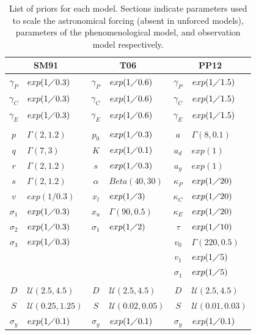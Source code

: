 \documentclass[a4paper,12pt]{article}
\begin{document}
\begin{table}[t]
\begin{center}
\begin{tabular}{| c l | c l | c l |}
\hline
\multicolumn{2}{|c|}{SM91} & \multicolumn{2}{|c|}{T06} & \multicolumn{2}{|c|}{PP12} \\
\hline
$\gamma_P$ & $exp(1 \diagup 0.3)$ & $\gamma_P$ & $exp(1 \diagup 0.6)$ & $\gamma_P$ & $exp(1 \diagup 1.5)$ \\
$\gamma_C$ & $exp(1 \diagup 0.3)$ & $\gamma_C$ & $exp(1 \diagup 0.6)$ & $\gamma_C$ & $exp(1 \diagup 1.5)$ \\
$\gamma_E$ & $exp(1 \diagup 0.3)$ & $\gamma_E$ & $exp(1 \diagup 0.6)$ & $\gamma_E$ & $exp(1 \diagup 1.5)$ \\
& & & & & \\
$p$ & $\Gamma(2,1.2)$ & $p_0$ & $exp(1 \diagup 0.3)$ & $a$ & $\Gamma(8,0.1)$\\
$q$ & $\Gamma(7,3)$ & $K$ & $exp(1 \diagup 0.1)$ & $a_d$ & $exp(1)$\\
$r$ & $\Gamma(2,1.2)$ & $s$ & $exp(1 \diagup 0.3)$ & $a_g$ & $exp(1)$\\
$s$ & $\Gamma(2,1.2)$ & $\alpha$ & $Beta(40,30)$ & $\kappa_P$ & $exp(1 \diagup 20)$ \\ 
$v$ & $exp(1/0.3)$ & $x_l$ & $exp(1 \diagup 3)$ & $\kappa_C$ & $exp(1 \diagup 20)$ \\
$\sigma_1$ & $exp(1 \diagup 0.3)$ & $x_u$ & $\Gamma(90,0.5)$ & $\kappa_E$ & $exp(1 \diagup 20)$ \\
$\sigma_2$ & $exp(1 \diagup 0.3)$ & $\sigma_1$ & $exp(1 \diagup 2)$ & $\tau$ & $exp(1 \diagup 10)$ \\
$\sigma_3$ & $exp(1 \diagup 0.3)$ & & & $v_0$ & $\Gamma(220,0.5)$ \\
& & & & $v_1$ & $exp(1 \diagup 5)$\\
& & & & $\sigma_1$ & $exp(1 \diagup 5)$ \\
& & & & & \\
$D$ & $\mathcal{U}(2.5,4.5)$ & $D$ & $\mathcal{U}(2.5,4.5)$ & $D$ & $\mathcal{U}(2.5,4.5)$ \\
$S$ & $\mathcal{U}(0.25,1.25)$ & $S$ & $\mathcal{U}(0.02,0.05)$ & $S$ & $\mathcal{U}(0.01,0.03)$ \\
$\sigma_y$ & $exp(1 \diagup 0.1)$ & $\sigma_y$ & $exp(1 \diagup 0.1)$ & $\sigma_y$ & $exp(1 \diagup 0.1)$ \\
\hline
\end{tabular}
\label{Tab:Priors}
\caption{List of priors for each model.
Sections indicate parameters used to scale the astronomical forcing (absent in unforced models), parameters of the phenomenological model, and observation model respectively.}
\end{center}
\end{table}
\end{document}
